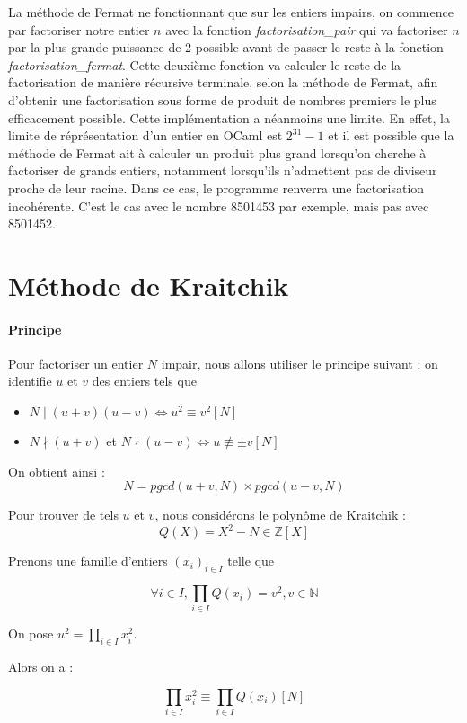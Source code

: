 \documentclass[11pt,a4paper]{article}
\begin{document}
	La méthode de Fermat ne fonctionnant que sur les entiers impairs, on commence par factoriser notre entier $n$ avec la fonction \textit{factorisation\_pair} qui va factoriser $n$ par la plus grande puissance de 2 possible avant de passer le reste à la fonction \textit{factorisation\_fermat}. Cette deuxième fonction va calculer le reste de la factorisation de manière récursive terminale, selon la méthode de Fermat, afin d'obtenir une factorisation sous forme de produit de nombres premiers le plus efficacement possible. Cette implémentation a néanmoins une limite. En effet, la limite de réprésentation d'un entier en OCaml est $2^{31} - 1$ et il est possible que la méthode de Fermat ait à calculer un produit plus grand lorsqu'on cherche à factoriser de grands entiers, notamment lorsqu'ils n'admettent pas de diviseur proche de leur racine. Dans ce cas, le programme renverra une factorisation incohérente. C'est le cas avec le nombre 8501453 par exemple, mais pas avec 8501452.

	
	\section{\LARGE{Méthode de Kraitchik}}
	
	\paragraph{Principe}
	Pour factoriser un entier $N$ impair, nous allons utiliser le principe suivant : on identifie $u$ et $v$ des entiers tels que 
	\begin{itemize}
		\item $N \mid(u+v)(u-v) \iff u^2 \equiv v^2 [N]$
		\item $N \nmid(u+v)$ et $ N \nmid(u-v) \iff u \not\equiv \pm v [N]$ 
	\end{itemize}
	
	On obtient ainsi :
	$$N = pgcd(u+v, N) \times pgcd(u-v, N)$$
	
	Pour trouver de tels $u$ et $v$, nous considérons le polynôme de Kraitchik : $$Q(X) = X^2 - N  \in \mathbb{Z}[X]$$
	
	Prenons une famille d'entiers $(x_i)_{i \in I}$ telle que
	
	 $$\forall i \in I, \prod_{i \in I} Q(x_i) = v^2, v \in \mathbb{N}$$ 
	 
	  On pose $u^2 = \prod_{i \in I}x_i^2$.
	
	 Alors on a : 
	
		$$\prod_{i \in I} x_i^2 \equiv \prod_{i \in I} Q(x_i) [N]$$
		
\end{document}
